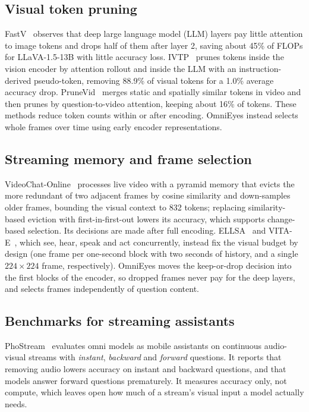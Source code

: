 \documentclass[conference]{IEEEtran}
\begin{document}
\subsection{Visual token pruning}
FastV~\cite{chen2024fastv} observes that deep large language model (LLM) layers pay little attention to image tokens and drops half of them after layer 2, saving about 45\% of FLOPs for LLaVA-1.5-13B with little accuracy loss. IVTP~\cite{huang2024ivtp} prunes tokens inside the vision encoder by attention rollout and inside the LLM with an instruction-derived pseudo-token, removing 88.9\% of visual tokens for a 1.0\% average accuracy drop. PruneVid~\cite{huang2024prunevid} merges static and spatially similar tokens in video and then prunes by question-to-video attention, keeping about 16\% of tokens. These methods reduce token counts within or after encoding. OmniEyes instead selects whole frames over time using early encoder representations.

\subsection{Streaming memory and frame selection}
VideoChat-Online~\cite{huang2025ovbench} processes live video with a pyramid memory that evicts the more redundant of two adjacent frames by cosine similarity and down-samples older frames, bounding the visual context to 832 tokens; replacing similarity-based eviction with first-in-first-out lowers its accuracy, which supports change-based selection. Its decisions are made after full encoding. ELLSA~\cite{wang2026ellsa} and VITA-E~\cite{liu2025vitae}, which see, hear, speak and act concurrently, instead fix the visual budget by design (one frame per one-second block with two seconds of history, and a single $224{\times}224$ frame, respectively). OmniEyes moves the keep-or-drop decision into the first blocks of the encoder, so dropped frames never pay for the deep layers, and selects frames independently of question content.

\subsection{Benchmarks for streaming assistants}
PhoStream~\cite{lu2026phostream} evaluates omni models as mobile assistants on continuous audio-visual streams with \emph{instant}, \emph{backward} and \emph{forward} questions. It reports that removing audio lowers accuracy on instant and backward questions, and that models answer forward questions prematurely. It measures accuracy only, not compute, which leaves open how much of a stream's visual input a model actually needs.
\end{document}
